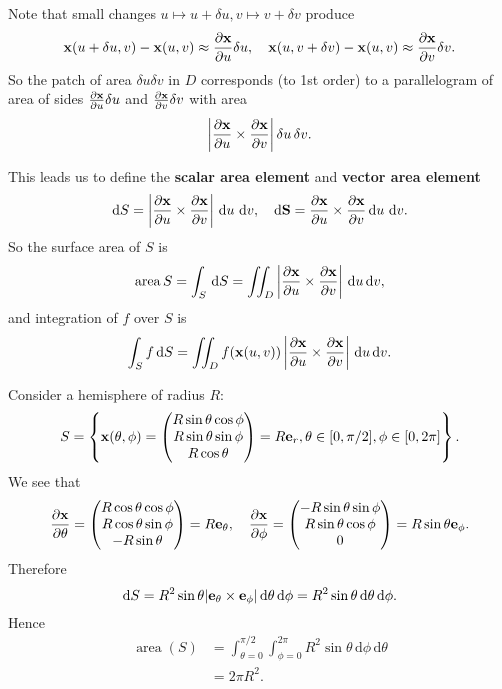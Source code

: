 Note that small changes $ u \mapsto u+\delta u,v \mapsto v+\delta v $ produce 
\[
    {\bf x}(u+\delta u,v)-{\bf x}(u,v) \approx \frac{\partial {\bf x}}{\partial u}\delta u ,\quad {\bf x}(u,v+\delta v)-{\bf x}(u,v) \approx \frac{\partial {\bf x}}{\partial v}\delta v.
\]
So the patch of area $ \delta u \delta v $ in $D$ corresponds (to 1st order) to a parallelogram of area of sides $ \frac{\partial {\bf x}}{\partial u}\delta u  $ and $ \frac{\partial {\bf x}}{\partial v}\delta v  $ with area 
\[
    \left| \frac{\partial {\bf x}}{\partial u}\times \frac{\partial {\bf x}}{\partial v} \right| \delta u \,\delta v.
\]

This leads us to define the \textbf{scalar area element} and \textbf{vector area element}
\[
    \mathrm{d} S = \left| \frac{\partial {\bf x}}{\partial u}\times \frac{\partial {\bf x}}{\partial v} \right| \,\mathrm{d} u \,\,\mathrm{d} v,\quad \mathrm{d} {\bf S} = \frac{\partial {\bf x}}{\partial u}\times \frac{\partial {\bf x}}{\partial v}  \,\mathrm{d} u \,\,\mathrm{d} v.
\]
So the surface area of $S$ is 
\[
    \operatorname{area} S = \int_{S} \,\mathrm{d}S = \iint_{D} \left| \frac{\partial {\bf x}}{\partial u}\times \frac{\partial {\bf x}}{\partial v} \right| \,\mathrm{d} u \,\mathrm{d} v,
\]
and integration of $f$ over $S$ is 
\[
    \int_{S} f \,\mathrm{d}S = \iint_{D} f({\bf x}(u,v)) \left| \frac{\partial {\bf x}}{\partial u}\times \frac{\partial {\bf x}}{\partial v} \right| \,\mathrm{d} u \,\mathrm{d} v.
\]

\begin{example}
    Consider a hemisphere of radius $R$:
    \[
        S = \left\{ {\bf x}(\theta,\phi) = \begin{pmatrix}
           R \sin \theta \cos \phi \\ R\sin \theta \sin \phi \\ R\cos \theta
        \end{pmatrix}=R{\bf e}_r,\theta\in [0,\pi/2],\phi\in [0,2\pi]\right\}.
    \]
    We see that 
    \[
        \frac{\partial {\bf x}}{\partial \theta} =  \begin{pmatrix}
            R \cos \theta \cos \phi \\ R\cos \theta \sin \phi \\ -R\sin \theta
         \end{pmatrix}=R{\bf e}_\theta,\quad
        \frac{\partial {\bf x}}{\partial \phi}= \begin{pmatrix}
            -R \sin \theta \sin \phi \\ R\sin \theta \cos \phi \\ 0
         \end{pmatrix}=R \sin \theta {\bf e}_\phi.
    \]
    Therefore 
    \[
        \mathrm{d} S = R^2 \sin \theta |{\bf e}_\theta\times {\bf e}_\phi| \,\mathrm{d} \theta\,\mathrm{d} \phi = R^2 \sin \theta\,\mathrm{d} \theta\,\mathrm{d} \phi.
    \]
    Hence 
    \begin{align*}
        \operatorname{area}(S) &= \int_{\theta=0}^{\pi/2} \int_{\phi=0}^{2\pi} R^2 \sin \theta \,\mathrm{d}\phi  \,\mathrm{d}\theta\\ 
        &= 2\pi R^2.
    \end{align*}
\end{example}

